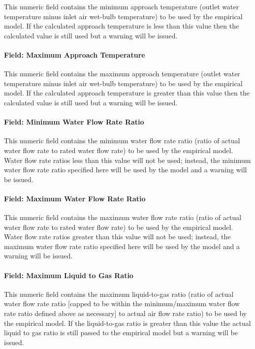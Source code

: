 This numeric field contains the minimum approach temperature (outlet water temperature minus inlet air wet-bulb temperature) to be used by the empirical model. If the calculated approach temperature is less than this value then the calculated value is still used but a warning will be issued.

\paragraph{Field: Maximum Approach Temperature}\label{field-maximum-approach-temperature-1}

This numeric field contains the maximum approach temperature (outlet water temperature minus inlet air wet-bulb temperature) to be used by the empirical model. If the calculated approach temperature is greater than this value then the calculated value is still used but a warning will be issued.

\paragraph{Field: Minimum Water Flow Rate Ratio}\label{field-minimum-water-flow-rate-ratio-1}

This numeric field contains the minimum water flow rate ratio (ratio of actual water flow rate to rated water flow rate) to be used by the empirical model. Water flow rate ratios less than this value will not be used; instead, the minimum water flow rate ratio specified here will be used by the model and a warning will be issued.

\paragraph{Field: Maximum Water Flow Rate Ratio}\label{field-maximum-water-flow-rate-ratio-1}

This numeric field contains the maximum water flow rate ratio (ratio of actual water flow rate to rated water flow rate) to be used by the empirical model. Water flow rate ratios greater than this value will not be used; instead, the maximum water flow rate ratio specified here will be used by the model and a warning will be issued.

\paragraph{Field: Maximum Liquid to Gas Ratio}\label{field-maximum-liquid-to-gas-ratio}

This numeric field contains the maximum liquid-to-gas ratio (ratio of actual water flow rate ratio {[}capped to be within the minimum/maximum water flow rate ratio defined above as necessary{]} to actual air flow rate ratio) to be used by the empirical model. If the liquid-to-gas ratio is greater than this value the actual liquid to gas ratio is still passed to the empirical model but a warning will be issued.

